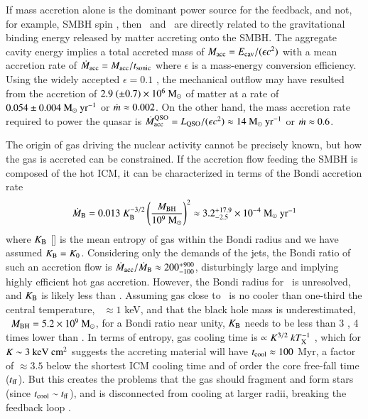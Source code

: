 \documentclass[referee,traditabstract]{aa}
\begin{document}
If mass accretion alone is the dominant power source for the feedback,
and not, for example, SMBH spin \citep{2002NewAR..46..247M, minaspin},
then \pcav\ and \lqso\ are directly related to the gravitational
binding energy released by matter accreting onto the SMBH. The
aggregate cavity energy implies a total accreted mass of $M_{\rm{acc}} =
E_{\rm{cav}}/(\epsilon c^2)$ with a mean accretion rate of $\dot{M}_{\rm{acc}} =
M_{\rm{acc}}/t_{\rm{sonic}}$ where $\epsilon$ is a mass-energy conversion
efficiency. Using the widely accepted $\epsilon = 0.1$
\citep{2002apa..book.....F}, the mechanical outflow may have resulted
from the accretion of $2.9 ~(\pm 0.7) \times 10^{6} ~\rm{M_{\odot}}$ of matter
at a rate of $0.054 \pm 0.004 ~\mbox{\ensuremath{\rm{M_{\odot}}~\rm{\mbox{\ensuremath{\rm{yr}}}^{-1}}}}$ or $\dot{m} \approx 0.002$. On
the other hand, the mass accretion rate required to power the quasar
is $\dot{M}_{\rm{acc}}^{\rm{QSO}} = L_{\rm{QSO}}/(\epsilon c^2) \approx 14 ~\mbox{\ensuremath{\rm{M_{\odot}}~\rm{\mbox{\ensuremath{\rm{yr}}}^{-1}}}}$ or $\dot{m}
\approx 0.6$.

The origin of gas driving the nuclear activity cannot be precisely
known, but how the gas is accreted can be constrained. If the
accretion flow feeding the SMBH is composed of the hot ICM, it can be
characterized in terms of the Bondi accretion rate
\begin{equation}
  \dot{M}_{\rm{B}} = 0.013 ~K_{\rm{B}}^{-3/2} \left(\frac{M_{\rm{BH}}}{10^9
    ~\rm{M_{\odot}}}\right)^{2} \approx 3.2^{+17.9}_{-2.5} \times 10^{-4}
  ~\mbox{\ensuremath{\rm{M_{\odot}}~\rm{\mbox{\ensuremath{\rm{yr}}}^{-1}}}}
\end{equation}
where $K_{\rm{B}}$ [\ent] is the mean entropy of gas within the Bondi
radius and we have assumed $K_{\rm{B}} = K_0$. Considering only the
demands of the jets, the Bondi ratio of such an accretion flow is
$\dot{M}_{\rm{acc}}/\dot{M}_{\rm{B}} \approx 200^{+900}_{-100}$, disturbingly large and
implying highly efficient hot gas accretion. However, the Bondi radius
for \irs\ is unresolved, and $K_{\rm{B}}$ is likely less than
\kna. Assuming gas close to \rbon\ is no cooler than one-third the
central temperature, \ie\ $\approx 1$ keV, and that the black hole
mass is underestimated, \ie\ $M_{\rm{BH}} = 5.2 \times 10^9 ~\rm{M_{\odot}}$, for a
Bondi ratio near unity, $K_{\rm{B}}$ needs to be less than 3 \ent, 4 times
lower than \kna. In terms of entropy, gas cooling time is $\propto
K^{3/2} ~kT_{\rm{X}}^{-1}$ \citep{d06}, which for $K \sim 3 ~\rm{\mbox{\ensuremath{\rm{keV}}}~\ensuremath{\rm{\mbox{\ensuremath{\rm{cm}}}^2}}}$ suggests
the accreting material will have $t_{\rm{cool}} \approx 100$ Myr, a factor of
$\approx 3.5$ below the shortest ICM cooling time and of order the
core free-fall time ($t_{\rm{ff}}$). But this creates the problems
that the gas should fragment and form stars (since $t_{\rm{cool}} \sim
t_{\rm{ff}}$), and is disconnected from cooling at larger radii,
breaking the feedback loop \citep{2006NewA...12...38S}.
\end{document}

